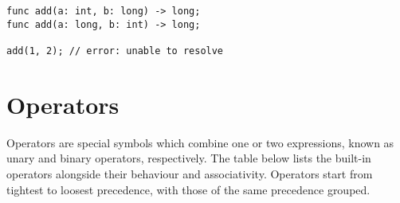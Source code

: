 \documentclass{article}
\begin{document}
    \begin{lstlisting}[language=CustomLang]
func add(a: int, b: long) -> long;
func add(a: long, b: int) -> long;

add(1, 2); // error: unable to resolve
    \end{lstlisting}

    \section{Operators}

    Operators are special symbols which combine one or two expressions, known as unary and binary operators, respectively.
    The table below lists the built-in operators alongside their behaviour and associativity.
    Operators start from tightest to loosest precedence, with those of the same precedence grouped.
\end{document}
